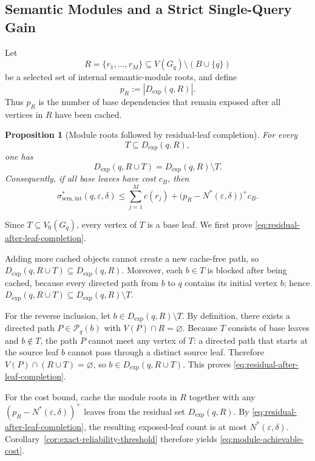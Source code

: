 \documentclass[journal]{IEEEtran}
\makeatletter
\newtheorem{proposition}{Proposition}[section]
\numberwithin{equation}{section}
\renewenvironment{proof}[1][\proofname]{\par
  \pushQED{\qed}%
  \normalfont \topsep6\p@\@plus6\p@\relax
  \trivlist
  \item[\hskip\labelsep
        \itshape
    #1\@addpunct{.}]\ignorespaces
}{%
  \popQED\endtrivlist\@endpefalse
}
\makeatother
\begin{document}
\subsection{Semantic Modules and a Strict Single-Query Gain}
\label{subsec:single-query-module-benchmark}

Let
\[
  R=\{r_1,\ldots,r_M\}
  \subseteq
  V(G_q)\setminus(B\cup\{q\})
\]
be a selected set of internal semantic-module roots, and define
\begin{equation}
  p_R:=|D_{\mathrm{exp}}(q,R)|.
\label{eq:def-module-residual-count}
\end{equation}
Thus \(p_R\) is the number of base dependencies that remain exposed after all
vertices in \(R\) have been cached.

\begin{proposition}[Module roots followed by residual-leaf completion]
\label{prop:module-root-achievability}
For every
\[
  T\subseteq D_{\mathrm{exp}}(q,R),
\]
one has
\begin{equation}
  D_{\mathrm{exp}}(q,R\cup T)
  =
  D_{\mathrm{exp}}(q,R)\setminus T.
\label{eq:residual-after-leaf-completion}
\end{equation}
Consequently, if all base leaves have cost \(c_B\), then
\begin{equation}
  \sigma_{\mathrm{sem,int}}^*
  (q,\varepsilon,\delta)
  \le
  \sum_{j=1}^{M}c(r_j)
  +
  \bigl(p_R-N^*(\varepsilon,\delta)\bigr)^+c_B.
\label{eq:module-achievable-cost}
\end{equation}
\end{proposition}

\begin{proof}
Since \(T\subseteq V_0(G_q)\), every vertex of \(T\) is a base leaf.  We first
prove \eqref{eq:residual-after-leaf-completion}.

Adding more cached objects cannot create a new cache-free path, so
\(D_{\mathrm{exp}}(q,R\cup T)\subseteq D_{\mathrm{exp}}(q,R)\).
Moreover, each \(b\in T\) is blocked after being cached, because every directed
path from \(b\) to \(q\) contains its initial vertex \(b\); hence
\(D_{\mathrm{exp}}(q,R\cup T)\subseteq D_{\mathrm{exp}}(q,R)\setminus T\).

For the reverse inclusion, let \(b\in D_{\mathrm{exp}}(q,R)\setminus T\).  By
definition, there exists a directed path \(P\in\mathcal P_q(b)\) with
\(V(P)\cap R=\varnothing\).
Because \(T\) consists of base leaves and \(b\notin T\), the path \(P\) cannot
meet any vertex of \(T\): a directed path that starts at the source leaf \(b\)
cannot pass through a distinct source leaf.  Therefore
\(V(P)\cap(R\cup T)=\varnothing\), so \(b\in D_{\mathrm{exp}}(q,R\cup T)\).
This proves \eqref{eq:residual-after-leaf-completion}.

For the cost bound, cache the module roots in \(R\) together with any
\((p_R-N^*(\varepsilon,\delta))^+\)
leaves from the residual set \(D_{\mathrm{exp}}(q,R)\).  By
\eqref{eq:residual-after-leaf-completion}, the resulting exposed-leaf count is
at most \(N^*(\varepsilon,\delta)\).  Corollary~\ref{cor:exact-reliability-threshold}
therefore yields \eqref{eq:module-achievable-cost}.
\end{proof}
\end{document}
